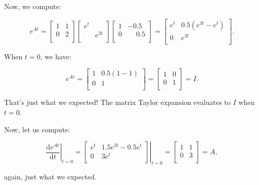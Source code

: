 \documentclass{article}
\begin{document}
Now, we compute:

\[
e^{At} = \begin{bmatrix}
1 & 1\\
0 & 2\\
\end{bmatrix}
\begin{bmatrix}
e^{t} & \\
      & e^{3t}\\
\end{bmatrix}
\begin{bmatrix}
1 & -0.5\\
0 & \phantom{-}0.5\\
\end{bmatrix}
=
\begin{bmatrix}
e^{t} & 0.5(e^{3t} - e^{t})\\
0 & e^{3t}\\
\end{bmatrix}.
\]

When $t = 0$, we have:

\[
e^{At} = \begin{bmatrix}
1 & 0.5(1 - 1)\\
0 & 1\\
\end{bmatrix}
=
\begin{bmatrix}
1 & 0\\
0 & 1\\
\end{bmatrix}
=
I.
\]

That's just what we expected! The matrix Taylor expansion evaluates to $I$ when $t = 0$.

Now, let us compute:

\[
\left.\frac{\text{d}e^{At}}{\text{d}t}\right|_{t = 0} = \left.\begin{bmatrix}
e^{t} & 1.5e^{3t} - 0.5e^{t}\\
0 & 3e^{t}\\
\end{bmatrix}\right|_{t=0}
=
\begin{bmatrix}
1 & 1\\
0 & 3\\
\end{bmatrix}
=
A,
\]

again, just what we expected.
\end{document}
